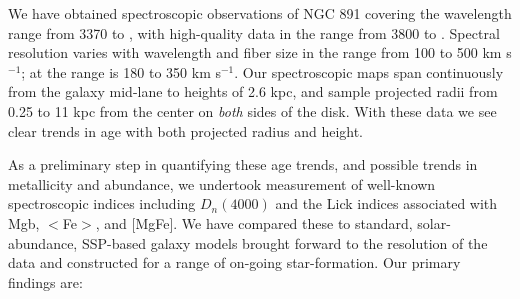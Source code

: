 
We have obtained spectroscopic observations of NGC 891 covering the
wavelength range from 3370 to , with high-quality data
in the range from 3800 to . Spectral resolution varies
with wavelength and fiber size in the range from 100 to 500 km
s$^{-1}$; at  the range is 180 to 350 km s$^{-1}$. Our
spectroscopic maps span continuously from the galaxy mid-lane to
heights of 2.6 kpc, and sample projected radii from 0.25 to 11 kpc
from the center on {\it both} sides of the disk. With these data we
see clear trends in age with both projected radius and height.

As a preliminary step in quantifying these age trends, and possible
trends in metallicity and abundance, we undertook measurement of
well-known spectroscopic indices including $D_n(4000)$ and the Lick
indices associated with Mgb, $<$Fe$>$, and [MgFe]. We have compared
these to standard, solar-abundance, SSP-based galaxy models brought
forward to the resolution of the data and constructed for a range of
on-going star-formation. Our primary findings are:


